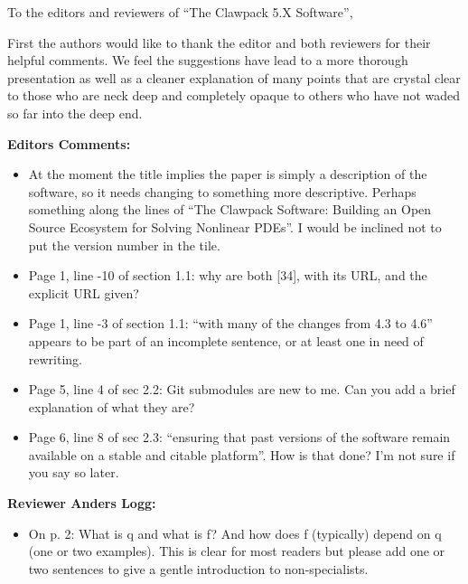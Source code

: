 \documentclass{letter}
\begin{document}
\address{Clawpack Developers}
\signature{Kyle T. Mandli, \\
           Aron J. Ahmadia, \\
           Donna Calhoun, \\
           David George, \\
           Yiannis Hadjimichael, \\ 
           David I. Ketcheson, \\
           Grady I. Lemoine, and \\
           Randall J. LeVeque}

\begin{letter}
{
}

\opening{To the editors and reviewers of ``The Clawpack 5.X Software'',}

First the authors would like to thank the editor and both reviewers for their
helpful comments.  We feel the suggestions have lead to a more thorough
presentation as well as a cleaner explanation of many points that are crystal
clear to those who are neck deep and completely opaque to others who have not
waded so far into the deep end.

\textbf{Editors Comments:}
\begin{itemize}
    \item At the moment the title implies the paper is simply a description of
    the software, so it needs changing to something more descriptive. Perhaps
    something along the lines of ``The Clawpack Software: Building an Open
    Source Ecosystem for Solving Nonlinear PDEs''. I would be inclined not to
    put the version number in the tile.
    \item Page 1, line -10 of section 1.1: why are both [34], with its URL, and
    the explicit URL given?
    \item Page 1, line -3 of section 1.1: ``with many of the changes from 4.3 to
    4.6'' appears to be part of an incomplete sentence, or at least one
    in need of rewriting.
    \item Page 5, line 4 of sec 2.2: Git submodules are new to me. Can you add a
    brief explanation of what they are?
    \item Page 6, line 8 of sec 2.3: ``ensuring that past versions of the
    software remain available on a stable and citable platform''. How is that
    done? I'm not sure if you say so later.
\end{itemize}

\textbf{Reviewer Anders Logg:}
\begin{itemize} 
    \item On p. 2: What is q and what is f? And how does f (typically) depend on
    q (one or two examples). This is clear for most readers but please add one
    or two sentences to give a gentle introduction to non-specialists.


\end{itemize}
\end{letter}
\end{document}
